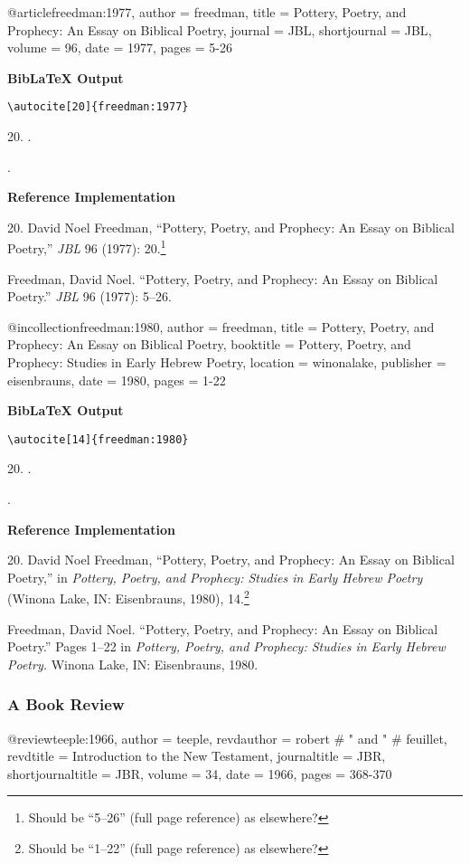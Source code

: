 \documentclass[a4paper]{article}
\newcommand\citetestns[3]{%
  {\textbf{BibLaTeX Output}\par
   \nobreak
   \texttt{\textbackslash autocite[#2]\{#3\}}\par
   \color{biblatex-colour}
   #1. \cite[#2]{#3}.\par
   \hangindent\bibindent\bibentrycite{#3}.\par}}
\newenvironment{refimp}{%
  \begin{minipage}{\linewidth}
    \setlength{\parskip}{1ex}
    \textbf{Reference Implementation}\par
    \nobreak
    \color{reference-colour}
}{\end{minipage}}
\newenvironment{vb}{%
  \setlength{\parskip}{0pt}
  \verbatim}{\endverbatim}
\begin{document}
\begin{vb}
@article{freedman:1977,
  author = freedman,
  title = {Pottery, Poetry, and Prophecy: An Essay on Biblical
           Poetry},
  journal = JBL,
  shortjournal = {JBL},
  volume = {96},
  date = {1977},
  pages = {5-26}
}
\end{vb}

\citetestns{20}{20}{freedman:1977}

\begin{refimp}
  20. David Noel Freedman, “Pottery, Poetry, and Prophecy: An Essay on
  Biblical Poetry,” \emph{JBL} 96 (1977): 20.\footnote{Should be “5–26” (full
    page reference) as elsewhere?}

  \hangindent\bibindent Freedman, David Noel. “Pottery, Poetry, and Prophecy:
  An Essay on Biblical Poetry.” \emph{JBL} 96 (1977): 5–26.
\end{refimp}

\begin{vb}
@incollection{freedman:1980,
  author = freedman,
  title = {Pottery, Poetry, and Prophecy: An Essay on Biblical
           Poetry},
  booktitle = {Pottery, Poetry, and Prophecy: Studies in Early
               Hebrew Poetry},
  location = winonalake,
  publisher = eisenbrauns,
  date = {1980},
  pages = {1-22}
}
\end{vb}

\citetestns{20}{14}{freedman:1980}

\begin{refimp}
  20. David Noel Freedman, “Pottery, Poetry, and Prophecy: An Essay on Biblical
  Poetry,” in \emph{Pottery, Poetry, and Prophecy: Studies in Early Hebrew
  Poetry} (Winona Lake, IN: Eisenbrauns, 1980), 14.\footnote{Should be “1–22”
  (full page reference) as elsewhere?}

  \hangindent\bibindent Freedman, David Noel. “Pottery, Poetry, and Prophecy:
  An Essay on Biblical Poetry.” Pages 1–22 in \emph{Pottery, Poetry, and
  Prophecy: Studies in Early Hebrew Poetry.} Winona Lake, IN: Eisenbrauns,
  1980.
\end{refimp}

\subsubsection{A Book Review}

\begin{vb}
@review{teeple:1966,
  author = teeple,
  revdauthor = robert # " and " # feuillet,
  revdtitle = {Introduction to the New Testament},
  journaltitle = JBR,
  shortjournaltitle = {JBR},
  volume = {34},
  date = {1966},
  pages = {368-370}
}
\end{vb}
\end{document}
